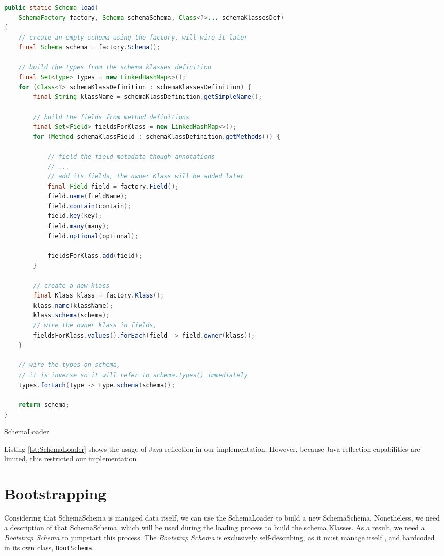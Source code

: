 \begin{sourcecode} [H]
	\begin{lstlisting}[language=Java, escapechar=|]
public static Schema load(
	SchemaFactory factory, Schema schemaSchema, Class<?>... schemaKlassesDef) 
{
	// create an empty schema using the factory, will wire it later
	final Schema schema = factory.Schema();

	// build the types from the schema klasses definition
	final Set<Type> types = new LinkedHashMap<>();
	for (Class<?> schemaKlassDefinition : schemaKlassesDefinition) {
		final String klassName = schemaKlassDefinition.getSimpleName();

		// build the fields from method definitions
		final Set<Field> fieldsForKlass = new LinkedHashMap<>();
		for (Method schemaKlassField : schemaKlassDefinition.getMethods()) {

			// field the field metadata though annotations
			// ...
			// add its fields, the owner Klass will be added later
            final Field field = factory.Field();
            field.name(fieldName);
            field.contain(contain);
            field.key(key);
            field.many(many);
            field.optional(optional);

            fieldsForKlass.add(field);
		}
   
		// create a new klass
		final Klass klass = factory.Klass();
		klass.name(klassName);
		klass.schema(schema);
		// wire the owner klass in fields,
		fieldsForKlass.values().forEach(field -> field.owner(klass));
	}

	// wire the types on schema, 
	// it is inverse so it will refer to schema.types() immediately
	types.forEach(type -> type.schema(schema));

	return schema;
}
	\end{lstlisting}
	\caption{SchemaLoader}
	\label{lst:SchemaLoader}
\end{sourcecode}

Listing \ref{lst:SchemaLoader} shows the usage of Java reflection in our implementation.
However, because Java reflection capabilities are limited, this restricted our implementation.

\section{Bootstrapping}\label{sec:Bootstrapping}
Considering that SchemaSchema is managed data itself, we can use the SchemaLoader to build a new SchemaSchema.
Nonetheless, we need a description of that SchemaSchema, which will be used during the loading process to build the schema Klasses.
As a result, we need a \textit{Bootstrap Schema} to jumpstart this process.
The \textit{Bootstrap Schema} is exclusively self-describing, as it must manage itself \cite{loh2012managed}, and hardcoded in its own class, \texttt{BootSchema}.

